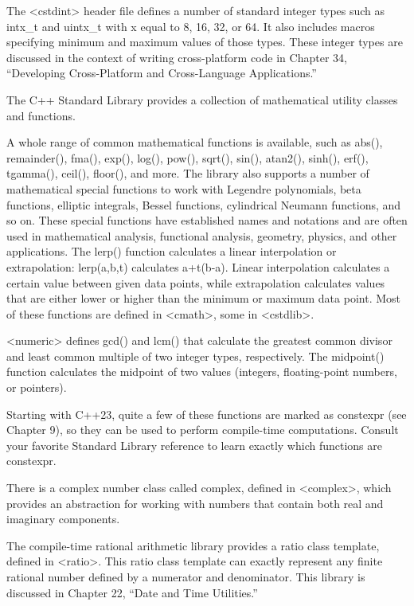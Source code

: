 
The <cstdint> header file defines a number of standard integer types such as intx\_t and uintx\_t with x equal to 8, 16, 32, or 64. It also includes macros specifying minimum and maximum values of those types. These integer types are discussed in the context of writing cross-platform code in Chapter 34, “Developing Cross-Platform and Cross-Language Applications.”


The C++ Standard Library provides a collection of mathematical utility classes and functions.

A whole range of common mathematical functions is available, such as abs(), remainder(), fma(), exp(), log(), pow(), sqrt(), sin(), atan2(), sinh(), erf(), tgamma(), ceil(), floor(), and more. The library also supports a number of mathematical special functions to work with Legendre polynomials, beta functions, elliptic integrals, Bessel functions, cylindrical Neumann functions, and so on. These special functions have established names and notations and are often used in mathematical analysis, functional analysis, geometry, physics, and other applications. The lerp() function calculates a linear interpolation or extrapolation: lerp(a,b,t) calculates a+t(b-a). Linear interpolation calculates a certain value between given data points, while extrapolation calculates values that are either lower or higher than the minimum or maximum data point. Most of these functions are defined in <cmath>, some in <cstdlib>.

<numeric> defines gcd() and lcm() that calculate the greatest common divisor and least common multiple of two integer types, respectively. The midpoint() function calculates the midpoint of two values (integers, floating-point numbers, or pointers).

Starting with C++23, quite a few of these functions are marked as constexpr (see Chapter 9), so they can be used to perform compile-time computations. Consult your favorite Standard Library reference to learn exactly which functions are constexpr.

There is a complex number class called complex, defined in <complex>, which provides an abstraction for working with numbers that contain both real and imaginary components.

The compile-time rational arithmetic library provides a ratio class template, defined in <ratio>.
This ratio class template can exactly represent any finite rational number defined by a numerator and denominator. This library is discussed in Chapter 22, “Date and Time Utilities.”

